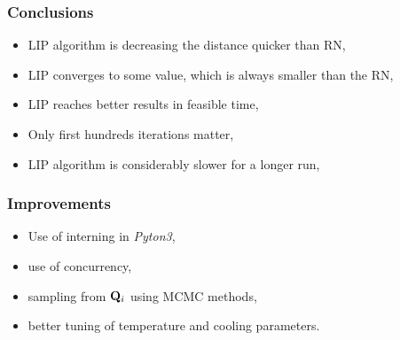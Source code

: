 \begin{frame}
	\frametitle{Conclusions}
	\begin{itemize}
		\item LIP algorithm is decreasing the distance quicker than RN,
		\item LIP converges to some value, which is always smaller than the RN,
		\item LIP reaches better results in feasible time,
		\item Only first hundreds iterations matter,
		\item LIP algorithm is considerably slower for a longer run,
	\end{itemize}
\end{frame}

\begin{frame}
	\frametitle{Improvements}
	\begin{itemize}
		\item Use of interning in \textit{Pyton3},
		\item use of concurrency,
		\item sampling from $\mathbf{Q}_{i}$ using MCMC methods,
		\item better tuning of temperature and cooling parameters.
	\end{itemize}
\end{frame}